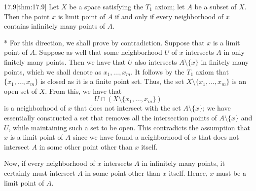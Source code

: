 \begin{thmBox}{17.9}[thm:17.9]
    Let \( X \) be a space satisfying the \( T_{ 1 } \) axiom; let \( A \) be a 
    subset of \( X \).
    Then the point \( x \) is limit point of \( A \) if and only if every
    neighborhood of \( x \) contains infinitely many points of \( A \).

    \baseRule

    \begin{proofBox}*
        \wrapBox{\( \implies \)} 
        For this direction, we shall prove by contradiction.
        Suppose that \( x \) is a limit point of \( A \).
        Suppose as well that some neighborhood \( U \) of \( x \) intersects
        \( A \) in only finitely many points.
        Then we have that \( U \) also intersects \( A \setminus \{ x \} \)
        in finitely many points, which we shall denote as 
        \( x_{ 1 } , \ldots , x_{ m } \).
        It follows by the \( T_{ 1 } \) axiom that \( \{ x_{ 1 } , \ldots , 
        x_{ m } \} \) is closed as it is a finite point set.
        Thus, the set \( X \setminus \{ x_{ 1 } , \ldots , x_{ m } \} \) is an
        open set of \( X \).
        From this, we have that
        \begin{equation*}
            U \cap ( X \setminus \{ x_{ 1 } , \ldots , x_{ m } \} )
        \end{equation*}
        is a neighborhood of \( x \) that does not intersect with the set 
        \( A \setminus \{ x \} \); we have essentially constructed a set that 
        removes all the intersection points of \( A \setminus \{ x \} \) and 
        \( U \), while maintaining such a set to be open.
        This contradicts the assumption that \( x \) is a limit point of 
        \( A \) since we have found a neighborhood of \( x \) that does not 
        intersect \( A \) in some other point other than \( x \) itself.

        \baseSkip 

        \wrapBox{\( \impliedby \)} 
        Now, if every neighborhood of \( x \) intersects \( A \) in infinitely 
        many points, it certainly must intersect \( A \) in some point other 
        than \( x \) itself.
        Hence, \( x \) must be a limit point of \( A \).
    \end{proofBox}
\end{thmBox}

